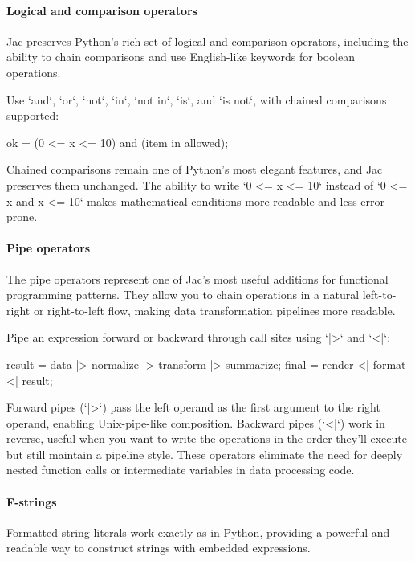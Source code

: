 \paragraph{Logical and comparison operators}

Jac preserves Python's rich set of logical and comparison operators, including the ability to chain comparisons and use English-like keywords for boolean operations.

Use `and`, `or`, `not`, `in`, `not in`, `is`, and `is not`, with chained comparisons supported:

\begin{jacblock}
ok = (0 <= x <= 10) and (item in allowed);
\end{jacblock}

Chained comparisons remain one of Python's most elegant features, and Jac preserves them unchanged. The ability to write `0 <= x <= 10` instead of `0 <= x and x <= 10` makes mathematical conditions more readable and less error-prone.

\paragraph{Pipe operators}

The pipe operators represent one of Jac's most useful additions for functional programming patterns. They allow you to chain operations in a natural left-to-right or right-to-left flow, making data transformation pipelines more readable.

Pipe an expression forward or backward through call sites using `|>` and `<|`:

\begin{jacblock}
result = data |> normalize |> transform |> summarize;
final  = render <| format <| result;
\end{jacblock}

Forward pipes (`|>`) pass the left operand as the first argument to the right operand, enabling Unix-pipe-like composition. Backward pipes (`<|`) work in reverse, useful when you want to write the operations in the order they'll execute but still maintain a pipeline style. These operators eliminate the need for deeply nested function calls or intermediate variables in data processing code.

\paragraph{F-strings}

Formatted string literals work exactly as in Python, providing a powerful and readable way to construct strings with embedded expressions.

